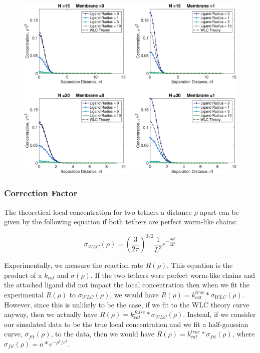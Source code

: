 \documentclass[../../AdvancementSummary.tex]{subfiles}
\begin{document}
\begin{figure}[H]
    \begin{center}
        		\includegraphics[width=0.8\linewidth]{ResultsFigures/EffectiveConcentrationKernel/ConcentrationNondimVSSeparation.eps}
        \caption{}
    \end{center}
\end{figure}


\subsubsection{Correction Factor}

The theoretical local concentration for two tethers a distance $\rho$ apart can be given by the following equation if both tethers are perfect worm-like chains:

\begin{equation}
	\sigma_{WLC}(\rho) = \left(\frac{3}{2\pi}\right)^{3/2} \frac{1}{L^3}e^{-\frac{3\rho^2}{2L^2}}
\end{equation}

Experimentally, we measure the reaction rate $R(\rho)$.  This equation is the product of a $k_{cat}$ and $\sigma(\rho)$.  If the two tethers were perfect worm-like chains and the attached ligand did not impact the local concentration then when we fit the experimental $R(\rho)$ to $\sigma_{WLC}(\rho)$, we would have $R(\rho) = k^{true}_{cat}*\sigma_{WLC}(\rho)$. However, since this is unlikely to be the case, if we fit to the WLC theory curve anyway, then we actually have $R(\rho) = k^{false}_{cat}*\sigma_{WLC}(\rho)$. Instead, if we consider our simulated data to be the true local concentration and we fit a half-gaussian curve, $\sigma_{fit}(\rho)$, to the data, then we would have $R(\rho) = k^{true}_{cat}*\sigma_{fit}(\rho)$, where $\sigma_{fit}(\rho) = a*e^{-\rho^2/c^2}$.
\end{document}
